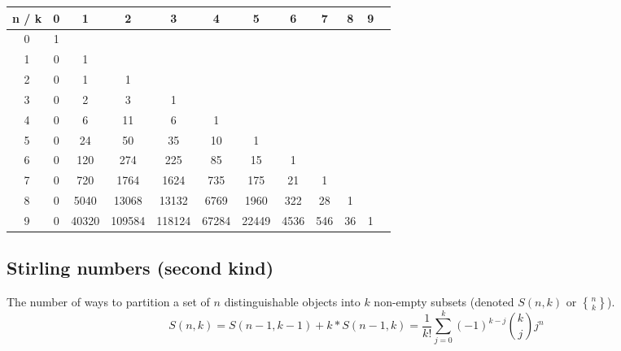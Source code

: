 \begin{center}
    \begin{tabular}{|c|c|c|c|c|c|c|c|c|c|c|c|}
        \hline
        n / k & 0 & 1 & 2 & 3 & 4 & 5 & 6 & 7 & 8 & 9 \\
        \hline
        0 & 1 & & & & & & & & & \\
        \hline
        1 & 0 & 1 & & & & & & & & \\
        \hline
        2 & 0 & 1 & 1 & & & & & & & \\
        \hline
        3 & 0 & 2 & 3 & 1 & & & & & & \\
        \hline
        4 & 0 & 6 & 11 & 6 & 1 & & & & & \\
        \hline
        5 & 0 & 24 & 50 & 35 & 10 & 1 & & & & \\
        \hline
        6 & 0 & 120 & 274 & 225 & 85 & 15 & 1 & & & \\
        \hline
        7 & 0 & 720 & 1764 & 1624 & 735 & 175 & 21 & 1 & & \\
        \hline
        8 & 0 & 5040 & 13068 & 13132 & 6769 & 1960 & 322 & 28 & 1 & \\
        \hline
        9 & 0 & 40320 & 109584 & 118124 & 67284 & 22449 & 4536 & 546 & 36 & 1 \\
        \hline
    \end{tabular}
\end{center}

\subsection*{Stirling numbers (second kind)}

The number of ways to partition a set of $n$ distinguishable objects into $k$ non-empty subsets (denoted $S(n, k)$ or $\genfrac{\{}{\}}{0pt}{}{n}{k}$).
$$S(n, k) = S(n-1, k-1) + k*S(n-1, k) = \frac{1}{k!} \sum_{j=0}^k (-1)^{k-j} \binom{k}{j} j^n$$

